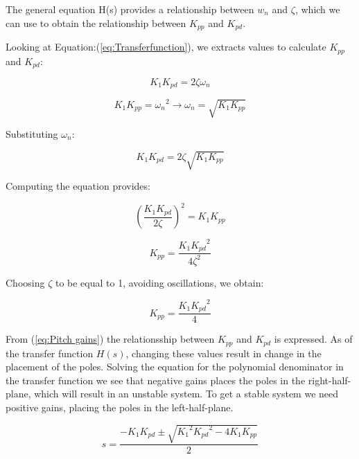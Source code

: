 The general equation H(s) provides a relationship between $w_n$ and $\zeta$, which we can use to obtain the relationship between $K_{pp}$ and $K_{pd}$.

Looking at Equation:(\ref{eq:Transferfunction}), we extracts values to calculate $K_{pp}$ and $K_{pd}$:

\begin{equation*}
    {K_1}{K_{pd}} = 2\zeta {\omega _n}
\end{equation*}

\begin{equation*}
    {K_1}{K_{pp}} = {\omega _n}^2 \to {\omega _n} = \sqrt {{K_1}{K_{pp}}}
\end{equation*}

Substituting $\omega_n$:

\begin{equation*}
    {K_1}{K_{pd}} = 2\zeta \sqrt {{K_1}{K_{pp}}} 
\end{equation*}

Computing the equation provides:

\begin{equation*}
    {\left( {\frac{{{K_1}{K_{pd}}}}{{2\zeta }}} \right)^2} = {K_1}{K_{pp}}
\end{equation*}

\begin{equation*}
    {K_{pp}} = \frac{{{K_1}{K_{pd}}^2}}{{4{\zeta ^2}}}
\end{equation*}

Choosing $\zeta$ to be equal to 1, avoiding oscillations, we obtain:

\begin{equation}\label{eq:Pitch gains}
    {K_{pp}} = \frac{{{K_1}{K_{pd}}^2}}{4}
\end{equation}

From (\ref{eq:Pitch gains}) the relationsship between $K_{pp}$ and $K_{pd}$ is expressed. As of the transfer function $H(s)$, changing these values result in change in the placement of the poles. Solving the equation for the polynomial denominator in the transfer function we see that negative gains places the poles in the right-half-plane, which will result in an unstable system. To get a stable system we need positive gains, placing the poles in the left-half-plane.

\begin{equation}\label{eq:transferfunction polynomial}
    s = \frac{{ - {K_1}{K_{pd}} \pm \sqrt {{K_1}^2{K_{pd}}^2 - 4{K_1}{K_{pp}}} }}{2}
\end{equation}

